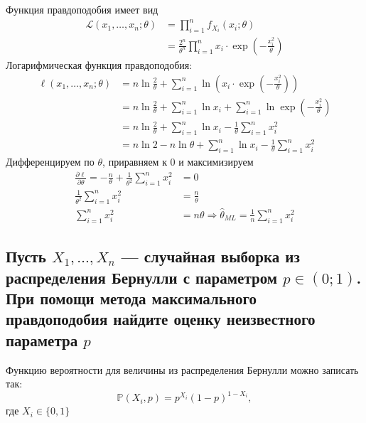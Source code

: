 \documentclass{article}
\begin{document}
Функция правдоподобия имеет вид
\begin{equation*}
    \begin{aligned}
        \mathcal{L}(x_1,\ldots,x_n;\theta)&=\prod_{i=1}^{n}f_{X_i}(x_i;\theta)\\
        &=\frac{2^n}{\theta^n}\prod_{i=1}^{n}x_i\cdot\exp\left(-\frac{x_i^2}{\theta}\right)
    \end{aligned}
\end{equation*}
Логарифмическая функция правдоподобия:
\begin{equation*}
    \begin{aligned}
        \ell(x_1,\ldots,x_n;\theta)&=n\ln\frac{2}{\theta}+\sum_{i=1}^n\ln\left(x_i\cdot\exp\left(-\frac{x_i^2}{\theta}\right)\right)\\
        &=n\ln\frac{2}{\theta}+\sum_{i=1}^n\ln x_i+\sum_{i=1}^n\ln \exp\left(-\frac{x_i^2}{\theta}\right)\\
        &=n\ln\frac{2}{\theta}+\sum_{i=1}^n\ln x_i-\frac{1}{\theta}\sum_{i=1}^nx_i^2\\
        &=n\ln2-n\ln\theta+\sum_{i=1}^n\ln x_i-\frac{1}{\theta}\sum_{i=1}^nx_i^2
    \end{aligned}
\end{equation*}
Дифференцируем по $\theta$, приравняем к 0 и максимизируем
\begin{equation*}
    \begin{aligned}
        \frac{\partial\ell}{\partial\theta}=-\frac{n}{\theta}+\frac{1}{\theta^2}\sum_{i=1}^nx_i^2&=0\\
        \frac{1}{\theta^2}\sum_{i=1}^nx_i^2&=\frac{n}{\theta}\\
        \sum_{i=1}^nx_i^2&=n\theta\Longrightarrow\widehat{\theta}_{ML}=\frac{1}{n}\sum_{i=1}^nx_i^2
    \end{aligned}
\end{equation*}

\subsection{Пусть $X_{1}, \ldots, X_{n}$ — случайная выборка из распределения Бернулли с параметром $p \in(0 ; 1)$. При помощи метода максимального правдоподобия найдите оценку неизвестного параметра $p$}
Функцию вероятности для величины из распределения Бернулли можно записать так:
\begin{equation*}
    \mathbb{P}\left(X_i,p\right)=p^{X_i}(1-p)^{1-X_i},
\end{equation*}
где $X_i\in\{0,1\}$
\end{document}
